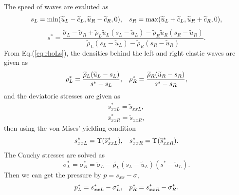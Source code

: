 \documentclass[review]{elsarticle}
\begin{document}
The speed of waves are evaluted as
\begin{equation}
  s_L = \text{min} (\widetilde{u}_L-\widetilde{c}_L, \widetilde{u}_R-\widetilde{c}_R,0), \hspace{0.3cm} s_R = \text{max}(\widetilde{u}_L+\widetilde{c}_L, \widetilde{u}_R+\widetilde{c}_R,0),
    \end{equation}
    \begin{equation}
      s^* = \frac{\widetilde{\sigma}_L-\widetilde{\sigma}_R+\widetilde{\rho}_L \widetilde{u}_L(s_L-\widetilde{u}_L)-\widetilde{\rho}_R \widetilde{u}_R(s_R-\widetilde{u}_R)}{\widetilde{\rho}_L(s_L-\widetilde{u}_L)-\widetilde{\rho}_R(s_R-\widetilde{u}_R)}.
\end{equation}
From  Eq.(\ref{eq:rhoLs}), the densities behind the left and right elastic  waves are given as
\begin{equation}
  \rho_L^* = \frac{\widetilde{\rho}_L(\widetilde{u}_L-s_L)}{s^*-s_L}, \hspace{0.3cm}  \rho_R^* = \frac{\widetilde{\rho}_R(\widetilde{u}_R-s_R)}{s^*-s_R},
\end{equation}
and the deviatoric stresses are  given as
  \begin{align}
  \overline{s}_{xxL}^* =  \widetilde{s}_{xxL},\\
  \overline{s}_{xxR}^* =  \widetilde{s}_{xxR},
\end{align}
then using  the von Mises' yielding condition
\begin{equation}
  s_{xxL}^* = \Upsilon(\overline{s}_{xxL}^*) , \hspace{0.3cm}  s_{xxR}^* = \Upsilon(\overline{s}_{xxR}^*).
\end{equation}
The Cauchy stresses  are solved as
\begin{equation}
  \sigma_L^*=\sigma_R^*=\widetilde{\sigma}_L -\widetilde{\rho_L} (s_L-\widetilde{u}_L)(s^*-\widetilde{u}_L).
\end{equation}
Then  we can get the pressure by $p =s_{xx}-\sigma$,
\begin{equation}
  p_L^* = s_{xxL}^* - \sigma_L^*, \hspace{0.3cm}   p_R^* = s_{xxR}^* - \sigma_R^*.
\end{equation}

%
\end{document}

